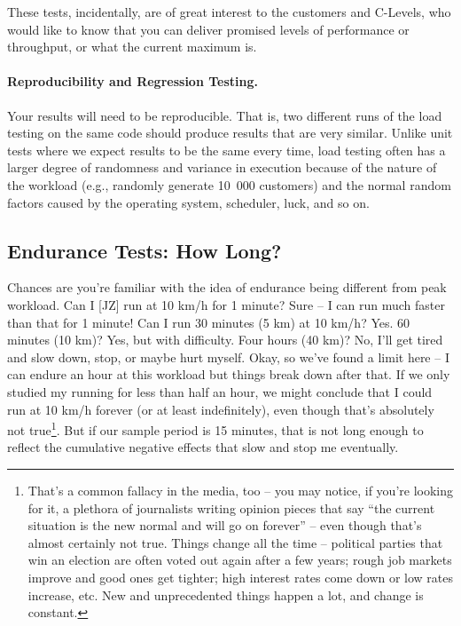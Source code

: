 These tests, incidentally, are of great interest to the customers and C-Levels, who would like to know that you can deliver promised levels of performance or throughput, or what the current maximum is.

\paragraph{Reproducibility and Regression Testing.}
Your results will need to be reproducible. That is, two different runs of the load testing on the same code should produce results that are very similar. Unlike unit tests where we expect results to be the same every time, load testing often has a larger degree of randomness and variance in execution because of the nature of the workload (e.g., randomly generate 10~000 customers) and the normal random factors caused by the operating system, scheduler, luck, and so on. 


\subsection*{Endurance Tests: How Long?}
Chances are you're familiar with the idea of endurance being different from peak workload. Can I [JZ] run at 10 km/h for 1 minute? Sure -- I can run much faster than that for 1 minute! Can I run 30 minutes (5 km) at 10 km/h? Yes. 60 minutes (10 km)? Yes, but with difficulty. Four hours (40 km)? No, I'll get tired and slow down, stop, or maybe hurt myself. Okay, so we've found a limit here -- I can endure an hour at this workload but things break down after that. If we only studied my running for less than half an hour, we might conclude that I could run at 10 km/h forever (or at least indefinitely), even though that's absolutely not true\footnote{That's a common fallacy in the media, too -- you may notice, if you're looking for it, a plethora of journalists writing opinion pieces that say ``the current situation is the new normal and will go on forever'' -- even though that's almost certainly not true. Things change all the time -- political parties that win an election are often voted out again after a few years; rough job markets improve and good ones get tighter; high interest rates come down or low rates increase, etc. New and unprecedented things happen a lot, and change is constant.}. But if our sample period is 15 minutes, that is not long enough to reflect the cumulative negative effects that slow and stop me eventually. 

